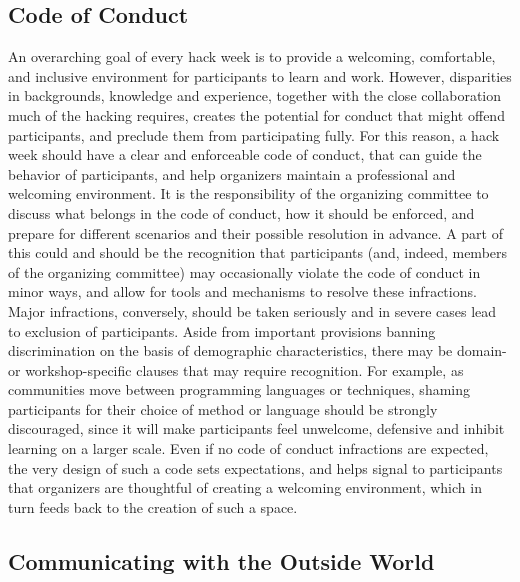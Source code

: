 \documentclass{aastex62}
\begin{document}
\subsection{Code of Conduct}

An overarching goal of every hack week is to provide a welcoming, comfortable, and inclusive environment for participants to learn and work.
However, disparities in backgrounds, knowledge and experience, together with the close collaboration much of the hacking requires, creates the potential for conduct that might offend participants, and preclude them from participating fully.
For this reason, a hack week should have a clear and enforceable code of conduct, that can guide the behavior of participants, and help organizers maintain a professional and welcoming environment.
It is the responsibility of the organizing committee to discuss what belongs in the code of conduct, how it should be enforced, and prepare for different scenarios and their possible resolution in advance.
A part of this could and should be the recognition that participants (and, indeed, members of the organizing committee) may occasionally violate the code of conduct in minor ways, and allow for tools and mechanisms to resolve these infractions. Major infractions, conversely, should be taken seriously and in severe cases lead to exclusion of participants.
Aside from important provisions banning discrimination on the basis of demographic characteristics, there may be domain- or workshop-specific clauses that may require recognition. For example, as communities move between programming languages or techniques, shaming participants for their choice of method or language should be strongly discouraged, since it will make participants feel unwelcome, defensive and inhibit learning on a larger scale.
Even if no code of conduct infractions are expected, the very design of such a code sets expectations, and helps signal to participants that organizers are thoughtful of creating a welcoming environment, which in turn feeds back to the creation of such a space.

\subsection{Communicating with the Outside World}
\end{document}
